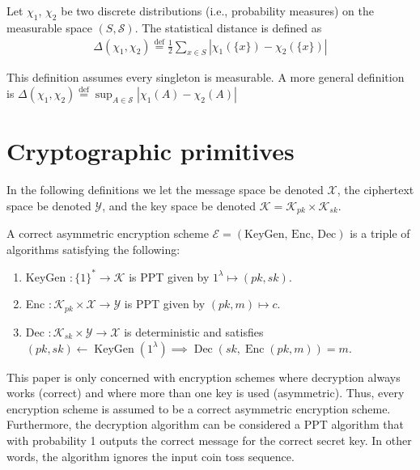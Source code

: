 \begin{definition}
    Let $\chi_1$, $\chi_2$ be two discrete distributions (i.e., probability measures) on the measurable space $(S, \mathcal{S})$. The statistical distance is defined as
    \begin{equation*}
    \begin{aligned}
        \Delta(\chi_1, \chi_2) \stackrel{\mathrm{def}}{=} \frac{1}{2} \sum_{x \in S} |\chi_1(\{x\}) - \chi_2(\{x\})|
    \end{aligned}
    \end{equation*}
\end{definition}
\begin{remark}
    This definition assumes every singleton is measurable. A more general definition is $\Delta(\chi_1, \chi_2) \stackrel{\mathrm{def}}{=} \sup _{A \in \mathcal{S}}|\chi_1(A)-\chi_2(A)|$ 
\end{remark}



\section{Cryptographic primitives}

In the following definitions we let the message space be denoted $\mathcal{X}$, the ciphertext space be denoted $\mathcal{Y}$, and the key space be denoted $\mathcal{K} = \mathcal{K}_{pk} \times \mathcal{K}_{sk}$.

\begin{definition}
A correct asymmetric encryption scheme $\mathcal{E} = (\text{KeyGen, Enc, Dec})$ is a triple of algorithms satisfying the following:
\begin{enumerate}[label={$\bullet$}]
    \item KeyGen $\colon \{1\}^* \to \mathcal{K}$ is PPT given by $1^{\lambda} \mapsto (pk,sk)$.
    \item Enc $\colon \mathcal{K}_{pk} \times \mathcal{X} \to \mathcal{Y}$ is PPT given by $(pk,m) \mapsto c$.
    \item Dec $\colon \mathcal{K}_{sk} \times \mathcal{Y} \to \mathcal{X}$ is deterministic and satisfies $(pk, sk) \leftarrow \operatorname{KeyGen}(1^{\lambda}) \implies \operatorname{Dec}(sk, \operatorname{Enc}(pk,m)) = m$.
\end{enumerate}
\end{definition}
\begin{remark}
This paper is only concerned with encryption schemes where decryption always works (correct) and where more than one key is used (asymmetric). Thus, every encryption scheme is assumed to be a correct asymmetric encryption scheme. Furthermore, the decryption algorithm can be considered a PPT algorithm that with probability 1 outputs the correct message for the correct secret key. In other words, the algorithm ignores the input coin toss sequence.
\end{remark}

